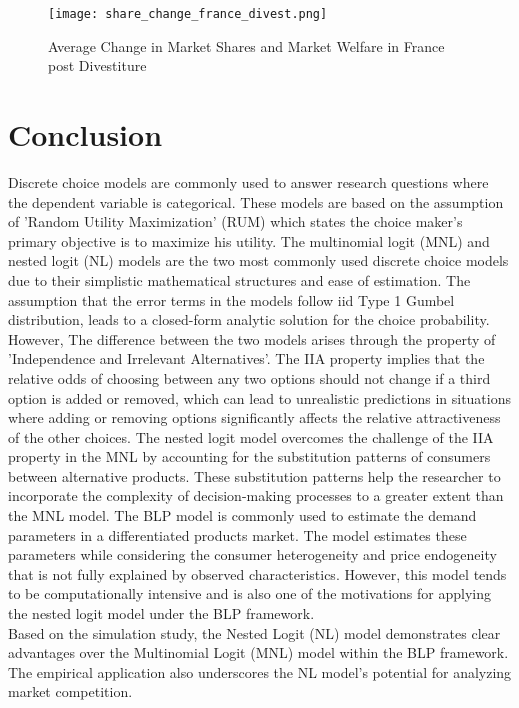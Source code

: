 \documentclass[a4paper,11pt]{article}
\begin{document}
    \begin{figure}[htb]
        \centering
        \texttt{[image: share\_change\_france\_divest.png]}
        \caption{Average Change in Market Shares and Market Welfare in France post Divestiture}
        \label{fig: Avg Change Divest}
    \end{figure}


\clearpage
\section{Conclusion}
\label{sec:Conclusion}

    Discrete choice models are commonly used to answer research questions where the dependent variable is categorical. These models are based on the assumption of 'Random Utility Maximization' (RUM) which states the choice maker's primary objective is to maximize his utility. The multinomial logit (MNL) and nested logit (NL) models are the two most commonly used discrete choice models due to their simplistic mathematical structures and ease of estimation. The assumption that the error terms in the models follow iid Type 1 Gumbel distribution, leads to a closed-form analytic solution for the choice probability. However, The difference between the two models arises through the property of 'Independence and Irrelevant Alternatives'. The IIA property implies that the relative odds of choosing between any two options should not change if a third option is added or removed, which can lead to unrealistic predictions in situations where adding or removing options significantly affects the relative attractiveness of the other choices. The nested logit model overcomes the challenge of the IIA property in the MNL by accounting for the substitution patterns of consumers between alternative products. These substitution patterns help the researcher to incorporate the complexity of decision-making processes to a greater extent than the MNL model. The BLP model is commonly used to estimate the demand parameters in a differentiated products market. The model estimates these parameters while considering the consumer heterogeneity and price endogeneity that is not fully explained by observed characteristics. However, this model tends to be computationally intensive and is also one of the motivations for applying the nested logit model under the BLP framework.\\
    
    Based on the simulation study, the Nested Logit (NL) model demonstrates clear advantages over the Multinomial Logit (MNL) model within the BLP framework. The empirical application also underscores the NL model's potential for analyzing market competition.\\ 
    
\end{document}
